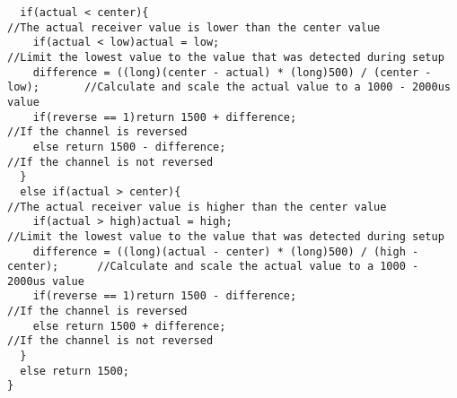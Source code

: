 \begin{lstlisting}
  if(actual < center){                                                         //The actual receiver value is lower than the center value
    if(actual < low)actual = low;                                              //Limit the lowest value to the value that was detected during setup
    difference = ((long)(center - actual) * (long)500) / (center - low);       //Calculate and scale the actual value to a 1000 - 2000us value
    if(reverse == 1)return 1500 + difference;                                  //If the channel is reversed
    else return 1500 - difference;                                             //If the channel is not reversed
  }
  else if(actual > center){                                                                        //The actual receiver value is higher than the center value
    if(actual > high)actual = high;                                            //Limit the lowest value to the value that was detected during setup
    difference = ((long)(actual - center) * (long)500) / (high - center);      //Calculate and scale the actual value to a 1000 - 2000us value
    if(reverse == 1)return 1500 - difference;                                  //If the channel is reversed
    else return 1500 + difference;                                             //If the channel is not reversed
  }
  else return 1500;
}

\end{lstlisting}